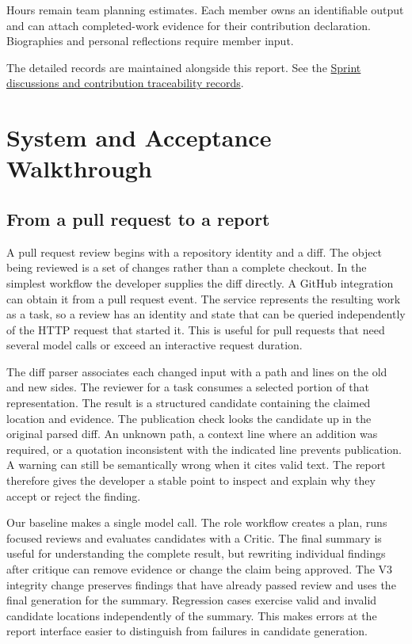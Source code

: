 \documentclass[journal,compsoc]{IEEEtran}
\begin{document}
Hours remain team planning estimates. Each member owns an identifiable output and can attach completed-work evidence for their contribution declaration. Biographies and personal reflections require member input.

The detailed records are maintained alongside this report. See the \href{https://github.com/Theo-sssssss/CS5351-Project/tree/6d5354a55d89e5d0cda04429d8007028f9ced160/docs/final-submission/process}{Sprint discussions and contribution traceability records}.

\section{System and Acceptance Walkthrough}
\subsection{From a pull request to a report}
A pull request review begins with a repository identity and a diff. The object being reviewed is a set of changes rather than a complete checkout. In the simplest workflow the developer supplies the diff directly. A GitHub integration can obtain it from a pull request event. The service represents the resulting work as a task, so a review has an identity and state that can be queried independently of the HTTP request that started it. This is useful for pull requests that need several model calls or exceed an interactive request duration.

The diff parser associates each changed input with a path and lines on the old and new sides. The reviewer for a task consumes a selected portion of that representation. The result is a structured candidate containing the claimed location and evidence. The publication check looks the candidate up in the original parsed diff. An unknown path, a context line where an addition was required, or a quotation inconsistent with the indicated line prevents publication. A warning can still be semantically wrong when it cites valid text. The report therefore gives the developer a stable point to inspect and explain why they accept or reject the finding.

Our baseline makes a single model call. The role workflow creates a plan, runs focused reviews and evaluates candidates with a Critic. The final summary is useful for understanding the complete result, but rewriting individual findings after critique can remove evidence or change the claim being approved. The V3 integrity change preserves findings that have already passed review and uses the final generation for the summary. Regression cases exercise valid and invalid candidate locations independently of the summary. This makes errors at the report interface easier to distinguish from failures in candidate generation.
\end{document}
